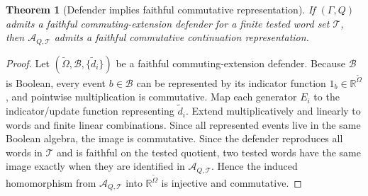 \documentclass[11pt]{article}
\newtheorem{theorem}{Theorem}[section]
\newcommand{\R}{\mathbb R}
\newcommand{\AQtest}{\mathcal A_{Q,\mathcal T}}
\begin{document}
\begin{theorem}[Defender implies faithful commutative representation]\label{thm:defender-to-commutative}
If $(\Gamma,Q)$ admits a faithful commuting-extension defender for a finite tested word set $\mathcal T$, then $\AQtest$ admits a faithful commutative continuation representation.
\end{theorem}
\begin{proof}
Let $(\widetilde\Omega,\mathcal B,\{\widetilde d_i\})$ be a faithful commuting-extension defender.  Because $\mathcal B$ is Boolean, every event $b\in\mathcal B$ can be represented by its indicator function $1_b\in\R^{\widetilde\Omega}$, and pointwise multiplication is commutative.  Map each generator $E_i$ to the indicator/update function representing $\widetilde d_i$.  Extend multiplicatively and linearly to words and finite linear combinations.  Since all represented events live in the same Boolean algebra, the image is commutative.  Since the defender reproduces all words in $\mathcal T$ and is faithful on the tested quotient, two tested words have the same image exactly when they are identified in $\AQtest$.  Hence the induced homomorphism from $\AQtest$ into $\R^{\widetilde\Omega}$ is injective and commutative.
\end{proof}
\end{document}
